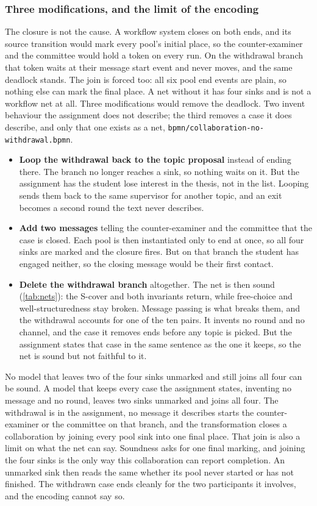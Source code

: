 \subsubsection{Three modifications, and the limit of the encoding}
\label{sec:global:fix}

The closure is not the cause. A workflow system closes on both ends, and its source transition would mark every pool's initial place, so the counter-examiner and the committee would hold a token on every run. On the withdrawal branch that token waits at their message start event and never moves, and the same deadlock stands. The join is forced too: all six pool end events are plain, so nothing else can mark the final place. A net without it has four sinks and is not a workflow net at all. Three modifications would remove the deadlock. Two invent behaviour the assignment does not describe; the third removes a case it does describe, and only that one exists as a net, \texttt{bpmn/collaboration-no-withdrawal.bpmn}.

\begin{itemize}
  \item \textbf{Loop the withdrawal back to the topic proposal} instead of ending there. The branch no longer reaches a sink, so nothing waits on it. But the assignment has the student lose interest in the thesis, not in the list. Looping sends them back to the same supervisor for another topic, and an exit becomes a second round the text never describes.
  \item \textbf{Add two messages} telling the counter-examiner and the committee that the case is closed. Each pool is then instantiated only to end at once, so all four sinks are marked and the closure fires. But on that branch the student has engaged neither, so the closing message would be their first contact.
  \item \textbf{Delete the withdrawal branch} altogether. The net is then sound (\cref{tab:nets}): the S-cover and both invariants return, while free-choice and well-structuredness stay broken. Message passing is what breaks them, and the withdrawal accounts for one of the ten pairs. It invents no round and no channel, and the case it removes ends before any topic is picked. But the assignment states that case in the same sentence as the one it keeps, so the net is sound but not faithful to it.
\end{itemize}

No model that leaves two of the four sinks unmarked and still joins all four can be sound. A model that keeps every case the assignment states, inventing no message and no round, leaves two sinks unmarked and joins all four. The withdrawal is in the assignment, no message it describes starts the counter-examiner or the committee on that branch, and the transformation closes a collaboration by joining every pool sink into one final place. That join is also a limit on what the net can say. Soundness asks for one final marking, and joining the four sinks is the only way this collaboration can report completion. An unmarked sink then reads the same whether its pool never started or has not finished. The withdrawn case ends cleanly for the two participants it involves, and the encoding cannot say so.
